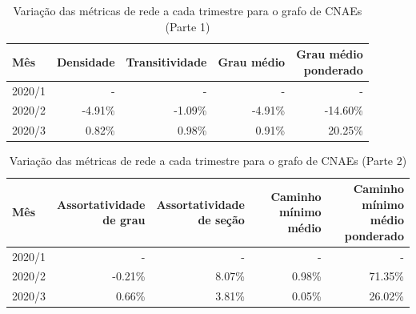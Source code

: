 \begin{table}[htb]
\centering
\caption{Variação das métricas de rede a cada trimestre para o grafo de CNAEs (Parte 1)}
\label{tab:metricas-redes-pandemia:grafo-trimestral-por-cnae1}
\begin{tabular}{l|rrrr}
\toprule
Mês & Densidade & Transitividade & Grau médio & \shortstack{Grau médio\\ponderado} \\
\midrule
2020/1 & - & - & - & - \\
2020/2 & -4.91\% & -1.09\% & -4.91\% & -14.60\% \\
2020/3 &  0.82\% &  0.98\% &  0.91\% &  20.25\% \\
\bottomrule
\end{tabular}
\fdadospesquisa
\end{table}

\begin{table}[htb]
\centering
\caption{Variação das métricas de rede a cada trimestre para o grafo de CNAEs (Parte 2)}
\label{tab:metricas-redes-pandemia:grafo-trimestral-por-cnae2}
\begin{tabular}{l|rrrr}
\toprule
Mês & \shortstack{Assortatividade\\de grau} & \shortstack{Assortatividade\\de seção} & \shortstack{Caminho mínimo\\médio} & \shortstack{Caminho mínimo\\médio ponderado} \\
\midrule
2020/1 & - & - & - & - \\
2020/2 & -0.21\% & 8.07\% & 0.98\% & 71.35\% \\
2020/3 &  0.66\% & 3.81\% & 0.05\% & 26.02\% \\
\bottomrule
\end{tabular}
\fdadospesquisa
\end{table}

